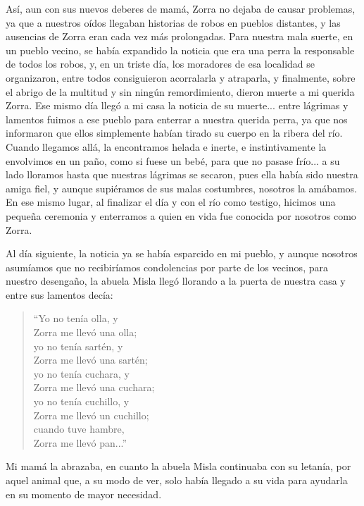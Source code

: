 Así, aun con sus nuevos deberes de mamá, Zorra no dejaba de causar problemas, ya que a nuestros oídos llegaban historias de robos en pueblos distantes, y las ausencias de Zorra eran cada vez más prolongadas.
Para nuestra mala suerte, en un pueblo vecino, se había expandido la noticia que era una perra la responsable de todos los robos, y, en un triste día, los moradores de esa localidad se organizaron, entre todos consiguieron acorralarla y atraparla, y finalmente, sobre el abrigo de la multitud y sin ningún remordimiento, dieron muerte a mi querida Zorra. 
Ese mismo día llegó a mi casa la noticia de su muerte... entre lágrimas y lamentos fuimos a ese pueblo para enterrar a nuestra querida perra, ya que nos informaron que ellos simplemente habían tirado su cuerpo en la ribera del río. Cuando llegamos allá, la encontramos helada e inerte, e instintivamente la envolvimos en un paño, como si fuese un bebé, para que no pasase frío... a su lado lloramos hasta que nuestras lágrimas se secaron, pues ella había sido nuestra amiga fiel, y aunque supiéramos de sus malas costumbres, nosotros la amábamos.
En ese mismo lugar, al finalizar el día y con el río como testigo, hicimos una pequeña ceremonia y enterramos a quien en vida fue conocida por nosotros como Zorra.

Al día siguiente, la noticia ya se había esparcido en mi pueblo, y aunque nosotros asumíamos que no recibiríamos condolencias por parte de los vecinos, para nuestro desengaño, la abuela Misla llegó llorando a la puerta de nuestra casa y entre sus lamentos decía:
\begin{quotation}
\noindent ``Yo no tenía olla, y \\Zorra me llevó una olla;\\ 
yo no tenía sartén, y \\Zorra me llevó una sartén;\\ 
yo no tenía cuchara, y \\Zorra me llevó una cuchara;\\
yo no tenía cuchillo, y \\Zorra me llevó un cuchillo;\\
cuando tuve hambre, \\Zorra me llevó pan...''
\end{quotation}
Mi mamá la abrazaba, en cuanto la abuela Misla continuaba con su letanía, por aquel animal que, a su modo de ver, solo había llegado a su vida para ayudarla en su momento de mayor necesidad.

